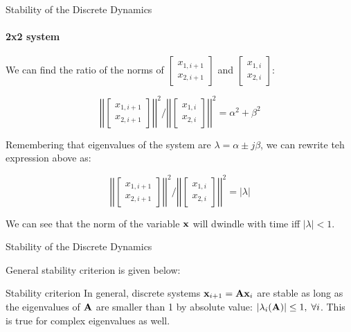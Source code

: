 \documentclass{beamer}
\begin{document}
\begin{frame}{Stability of the Discrete Dynamics}
	\framesubtitle{2x2 system}
	\begin{flushleft}
		
		We can find the ratio of the norms of $\begin{bmatrix}
			x_{1, i+1} \\ x_{2, i+1}
		\end{bmatrix}$ and $\begin{bmatrix}
			x_{1, i} \\ x_{2, i}
		\end{bmatrix}$: 
		
		
		
		\begin{equation}
			\left | \left|
			\begin{bmatrix}
				x_{1, i+1} \\ x_{2, i+1}
			\end{bmatrix}
			\right | \right|^2 
			/ 
			\left | \left|
			\begin{bmatrix}
				x_{1, i} \\ x_{2, i}
			\end{bmatrix}
			\right | \right|^2
			= 
			\alpha^2 + \beta^2
		\end{equation}
		
		Remembering that eigenvalues of the system are $\lambda  = \alpha \pm j\beta$, we can rewrite teh expression above as:
		
		\begin{equation}
	\left | \left|
	\begin{bmatrix}
		x_{1, i+1} \\ x_{2, i+1}
	\end{bmatrix}
	\right | \right|^2 
	/ 
	\left | \left|
	\begin{bmatrix}
		x_{1, i} \\ x_{2, i}
	\end{bmatrix}
	\right | \right|^2
	= 
	| \lambda |
		\end{equation}		
		
		We can see that the norm of the variable $\mathbf{x}$ will dwindle with time iff $|\lambda| < 1$.
		
	\end{flushleft}
\end{frame}




\begin{frame}{Stability of the Discrete Dynamics}
\begin{flushleft}

General stability criterion is given below:

\bigskip

\begin{block}{Stability criterion}
In general, discrete systems $\mathbf{x}_{i+1} = \mathbf{A}\mathbf{x}_i$ are stable as long as the eigenvalues of $\mathbf{A}$ are smaller than 1 by absolute value: $|\lambda_i(\mathbf{A})| \leq 1, \; \forall i$. This is true for complex eigenvalues as well.
\end{block}

\end{flushleft}
\end{frame}
\end{document}
